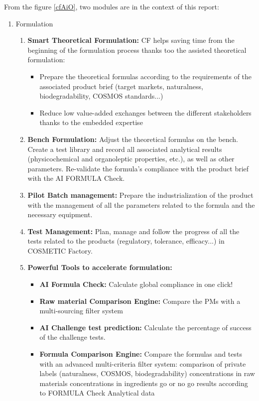 \documentclass[a4paper,12pt,twoside]{report}
\begin{document}
From the figure \ref{cfAiO}, two modules are in the context of this report:
\begin{enumerate}
\item Formulation
	\begin{enumerate}
	\item \textbf{Smart Theoretical Formulation:} CF helps saving time from the beginning of the formulation process thanks too the assisted theoretical formulation:
		\begin{itemize}
		\item Prepare the theoretical formulas according to the 
requirements of the associated product brief (target 
markets, naturalness, biodegradability, COSMOS standards...) 
		\item Reduce low value-added exchanges between the different 
stakeholders thanks to the embedded expertise
		\end{itemize}
	\item \textbf{Bench Formulation:} Adjust the theoretical formulas on the bench. Create a test 
library and record all associated analytical results (physicochemical 
and organoleptic properties, etc.), as well as other parameters. 
Re-validate the formula's compliance with the product brief with 
the AI FORMULA Check.
	\item \textbf{Pilot Batch management:} Prepare the industrialization of the product with the management 
of all the parameters related to the formula and the necessary 
equipment.
	\item \textbf{Test Management:} Plan, manage and follow the progress of all the tests related to the 
products (regulatory, tolerance, efficacy...) in COSMETIC Factory. 
	\item \textbf{Powerful Tools to accelerate formulation:}
	
	\begin{itemize}
		\item \textbf{AI Formula Check:} Calculate global compliance in one click!
		\item \textbf{Raw material Comparison Engine:}  Compare the PMs with 
a multi-sourcing filter system
		\item \textbf{AI Challenge test prediction:} Calculate the percentage of success of the challenge tests.
		\item \textbf{Formula Comparison Engine:} Compare the formulas and tests with an advanced multi-criteria filter system:
		\checkmark comparison of private labels (naturalness, COSMOS, biodegradability)
		\checkmark concentrations in raw materials
		\checkmark concentrations in ingredients
		\checkmark go or no go results according to FORMULA Check
		\checkmark Analytical data


\end{itemize}
\end{enumerate}
\end{enumerate}
\end{document}

